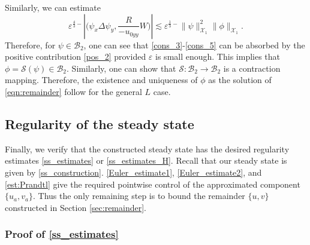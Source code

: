 \documentclass[reqno, 11pt]{amsart}
\theoremstyle{plain}
\theoremstyle{definition}
\theoremstyle{remark}
\numberwithin{equation}{section}
\newcommand\cB{\mathcal{B}}
\newcommand\cS{\mathcal{S}}
\newcommand\cX{\mathcal{X}}
\begin{document}
Similarly, we can estimate
\begin{equation}\label{cons_5}
\varepsilon^{\frac{4}{3}-} |\Big(\psi_x \Delta \psi_y, \frac{R}{-u_{0yy}} W \Big)| \lesssim \varepsilon^{\frac{1}{3}-} \| \psi \|_{\cX_1}^2 \| \phi\|_{\cX_1}.
\end{equation}
Therefore, for $\psi \in \cB_2$, one can see that \eqref{cons_3}-\eqref{cons_5} can be absorbed by the positive contribution \eqref{pos_2} provided $\varepsilon$ is small enough. This implies that $\phi = \cS(\psi) \in \cB_2$. Similarly, one can show that $\cS : \cB_2 \to \cB_2$ is a contraction mapping. Therefore,  the existence and uniqueness of $\phi$ as the solution of \eqref{eqn:remainder} follow for the general $L$ case.

\subsection{Regularity of the steady state}

Finally, we verify that the constructed steady state has the desired regularity estimates \eqref{ss_estimates} or \eqref{ss_estimates_H}. Recall that our steady state is given by \eqref{ss_construction}. \eqref{Euler_estimate1}, \eqref{Euler_estimate2}, and \eqref{est:Prandtl} give the required pointwise control of the approximated component $\{u_a, v_a\}$. Thus the only remaining step is to bound the remainder $\{u,v\}$ constructed in Section \ref{sec:remainder}.

\subsubsection{Proof of \eqref{ss_estimates}}
\end{document}
